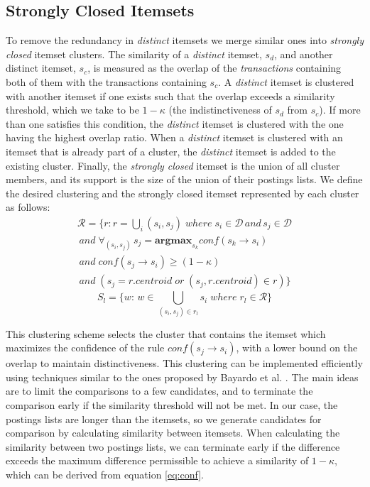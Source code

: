 \documentclass[letterpaper,12pt,titlepage,oneside,final]{book}
\begin{document}
\subsection{Strongly Closed Itemsets}
To remove the redundancy in \emph{distinct} itemsets we merge similar ones
into \emph{strongly closed} itemset clusters.
The similarity of a \emph{distinct} itemset,
$s_d$, and another distinct itemset, $s_c$,
is measured as the overlap of the \emph{transactions} containing both of them
with the transactions containing $s_c$. 
A \emph{distinct} itemset is clustered with another itemset if one exists
such that the overlap exceeds a similarity threshold,
which we take to be $1-\kappa$ (the indistinctiveness of $s_d$ from $s_c$).
If more than one satisfies this condition,
the  \emph{distinct} itemset is clustered with the one having the highest
overlap ratio.
When  a \emph{distinct} itemset is clustered with an itemset that is already
part of a cluster, the \emph{distinct} itemset is added to the existing cluster.
Finally, the \emph{strongly closed} itemset is the union of all cluster members,
and its support is the size of the union of their postings lists.
We define the  desired clustering  and the strongly closed itemset
represented by each cluster as follows:
\begin{align*}\label{eq:strongClosedFormal}
\mathcal{R} = \{r: r = \bigcup_i{(s_i, s_j)}\; where\; s_i \in \mathcal{D} \, and \, s_j \in \mathcal{D} 
\\\,and\; \forall_{(s_i,s_j)} \, s_j = \textbf{argmax}_{s_k} conf(s_k \rightarrow s_i) \\\,and \;conf(s_j \rightarrow s_i) \ge (1-\kappa)
\\\, and\;( s_j = r.centroid\; or \; (s_j, r.centroid) \in r )\}
\end{align*}
\begin{equation}S_l = \{w:\, w \in \bigcup_{(s_i, s_j) \in r_l}{s_i} \; where \; r_l \in \mathcal{R}\}\end{equation}

This clustering scheme selects the cluster that contains the itemset which
maximizes the confidence of the rule $conf(s_j \rightarrow s_i)$,
with a lower bound on the overlap to maintain distinctiveness. 
This clustering can be implemented efficiently using techniques similar to
the ones proposed by Bayardo et al. \cite{bayardo2007scaling}.
The main ideas are to limit the comparisons to a few candidates,
and to terminate the comparison early if the similarity threshold will not
be met.
In our case, the postings lists are longer than the itemsets,
so we generate candidates for comparison by calculating similarity between
itemsets.
When calculating the similarity between two postings lists,
we can terminate early if the difference exceeds the maximum difference
permissible to achieve a similarity of $1-\kappa$,
which can be derived from equation \ref{eq:conf}. 
\end{document}

